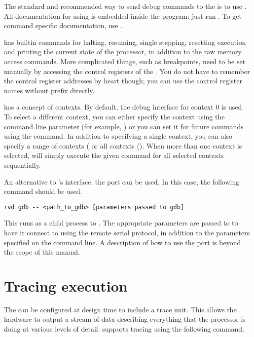 The standard and recommended way to send debug commands to the \rvex{} is to use
. All documentation for using  is embedded inside the
program: just run . To get command specific documentation, use
.

 has builtin commands for halting, resuming, single stepping, 
resetting execution and printing the current state of the processor, in addition 
to the raw memory access commands. More complicated things, such as breakpoints, 
need to be set manually by accessing the control registers of the \rvex{}. You 
do not have to remember the control register addresses by heart though; you can 
use the control register names without  prefix directly.

 has a concept of contexts. By default, the debug interface for 
context 0 is used. To select a different context, you can either specify the 
context using the  command line parameter (for example, ) or you can set it for future commands using the  
command. In addition to specifying a single context, you can also specify a 
range of contexts ( or all contexts (). When more
than one context is selected,  will simply execute the given command
for all selected contexts sequentially.

An alternative to 's interface, the  port can be used. In
this case, the following command should be used.

\begin{lstlisting}[numbers=none, language=nothing]
rvd gdb -- <path_to_gdb> [parameters passed to gdb]
\end{lstlisting}

\noindent This runs  as a child process to . The appropriate
parameters are passed to  to have it connect to  using the
remote serial protocol, in addition to the parameters specified on the command
line. A description of how to use the \rvex{}  port is beyond the
scope of this manual.

\section{Tracing execution}
\label{sec:rvd-trace}

The \rvex{} can be configured at design time to include a trace unit. This
allows the hardware to output a stream of data describing everything that the
processor is doing at various levels of detail.  supports tracing
using the following command.

